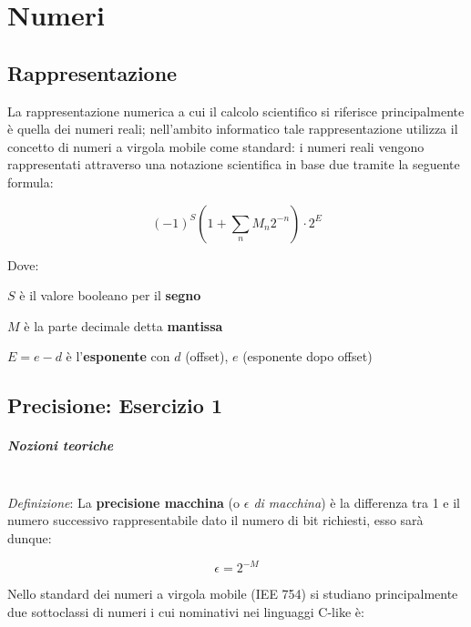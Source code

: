 \setchapterpreamble[u]{\margintoc}
\chapter{Numeri}

\section{Rappresentazione}

La rappresentazione numerica a cui il calcolo scientifico si riferisce principalmente
è quella dei numeri reali; nell’ambito informatico tale rappresentazione utilizza
il concetto di numeri a virgola mobile come standard: i numeri reali vengono
rappresentati attraverso una notazione scientifica in base due tramite la seguente formula:

$$
	(-1)^S \left( 1 + \sum_n M_n 2^{-n} \right) \cdot 2^{E}
$$

Dove:
\begin{description}
	\item $S$ è il valore booleano per il \textbf{segno}
	\item $M$ è la parte decimale detta \textbf{mantissa}

	\item $E = e - d$ è l'\textbf{esponente} con $d$ (offset), $e$ (esponente dopo offset)
\end{description}


\section{Precisione: Esercizio 1}


\paragraph{Nozioni teoriche} \mbox{}\\

\textit{Definizione}: La \textbf{precisione macchina} (o \textit{$\epsilon$ di macchina})
è la differenza tra 1 e il numero successivo rappresentabile dato il numero di bit
richiesti, esso sarà dunque:

$$
	\epsilon = 2^{-M}
$$


Nello standard dei numeri a virgola mobile (IEE 754) si studiano principalmente
due sottoclassi di numeri i cui nominativi nei linguaggi C-like è:

